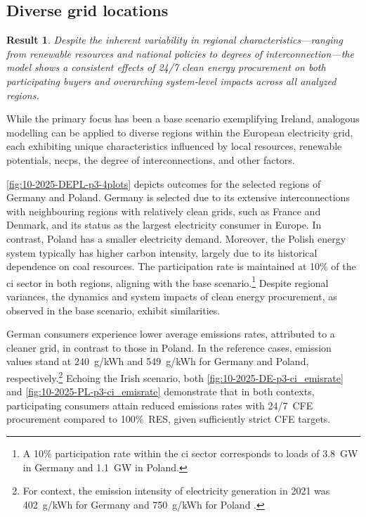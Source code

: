 \documentclass[11pt, 5p, nopreprintline]{elsarticle}
\newcommand{\co}{\ce{CO2}}
\newtheorem{res}[thm]{Result}  %
\begin{document}
\subsection{Diverse grid locations}
\label{subsec:location}

\begin{res}
    Despite the inherent variability in regional charac\-teristics---ranging from renewable resources and national policies to degrees of interconnection---the model shows a consistent effects of 24/7 clean energy procurement on both participating buyers and overarching system-level impacts across all analyzed regions.
\end{res}

While the primary focus has been a base scenario exemplifying Ireland, analogous modelling can be applied to diverse regions within the European electricity grid, each exhibiting unique characteristics influenced by local resources, renewable potentials, \gls{necp}s, the degree of interconnections, and other factors.

\cref{fig:10-2025-DEPL-p3-4plots} depicts outcomes for the selected regions of Germany and Poland.
Germany is selected due to its extensive interconnections with neighbouring regions with relatively clean grids, such as France and Denmark, and its status as the largest electricity consumer in Europe.
In contrast, Poland has a smaller electricity demand.
Moreover, the Polish energy system typically has higher carbon intensity, largely due to its historical dependence on coal resources.
The participation rate is maintained at 10\% of the \gls{ci} sector in both regions, aligning with the base scenario.\footnote{A 10\% participation rate within the \gls{ci} sector corresponds to loads of 3.8~GW in Germany and 1.1~GW in Poland.}
Despite regional variances, the dynamics and system impacts of clean energy procurement, as observed in the base scenario, exhibit similarities.

German consumers experience lower average emissions rates, attributed to a cleaner grid, in contrast to those in Poland.
In the reference cases, emission values stand at 240~g\co/kWh and 549~g\co/kWh for Germany and Poland, respectively.\footnote{For context, the emission intensity of electricity generation in 2021 was 402~g\co/kWh for Germany and 750~g\co/kWh for Poland \cite{EEA-GNGEmissionsEU}.}
Echoing the Irish scenario, both \cref{fig:10-2025-DE-p3-ci_emisrate} and \cref{fig:10-2025-PL-p3-ci_emisrate} demonstrate that in both contexts, participating consumers attain reduced emissions rates with 24/7~CFE procurement compared to 100\%~RES, given sufficiently strict CFE targets.
\end{document}
